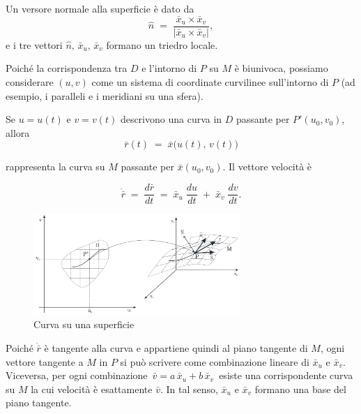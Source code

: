 Un versore normale alla superficie è dato da
\vspace{0.4em}
$$
\hat{n}
\;=\;
\dfrac{\bar{x}_u \times \bar{x}_v}{\bigl|\bar{x}_u \times \bar{x}_v\bigr|},
$$
e i tre vettori $\hat{n},\,\bar{x}_u,\,\bar{x}_v$ formano un triedro locale.

Poiché la corrispondenza tra $D$ e l’intorno di $P$ su $M$ è biunivoca, possiamo considerare $(u,v)$ come un sistema di coordinate curvilinee sull’intorno di $P$ (ad esempio, i paralleli e i meridiani su una sfera).

\newpage

Se $u=u(t)$ e $v=v(t)$ descrivono una curva in $D$ passante per $P'(u_0,v_0)$, allora
\vspace{0.4em}
$$
\bar{r}(t)
\;=\;
\bar{x}\bigl(u(t),\,v(t)\bigr)
$$

rappresenta la curva su $M$ passante per $\bar{x}(u_0,v_0)$. Il vettore velocità è

$$
\dot{\bar{r}}
\;=\;
\frac{d\bar{r}}{dt}
\;=\;
\bar{x}_u \;\frac{du}{dt}
\;+\;
\bar{x}_v \;\frac{dv}{dt}.
$$

\begin{figure}[H]
    \centering
    \includegraphics[width=0.7\textwidth]{assets/plane_trasf.png}
    \caption{Curva su una superficie}
\end{figure}

Poiché $\dot{\bar{r}}$ è tangente alla curva e appartiene quindi al piano tangente di $M$, ogni vettore tangente a $M$ in $P$ si può scrivere come combinazione lineare di $\bar{x}_u$ e $\bar{x}_v$. Viceversa, per ogni combinazione $\,\bar{v} = a\,\bar{x}_u + b\,\bar{x}_v\,$ esiste una corrispondente curva su $M$ la cui velocità è esattamente $\bar{v}$. In tal senso, $\bar{x}_u$ e $\bar{x}_v$ formano una base del piano tangente.

